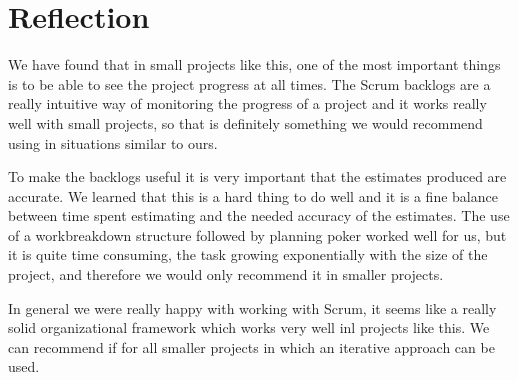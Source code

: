 \section{Reflection}

We have found that in small projects like this, one of the most important things
is to be able to see the project progress at all times. The Scrum backlogs are a
really intuitive way of monitoring the progress of a project and it works really
well with small projects, so that is definitely something we would recommend using
in situations similar to ours.

To make the backlogs useful it is very important that the estimates produced are
accurate. We learned that this is a hard thing to do well and it is a fine balance
between time spent estimating and the needed accuracy of the estimates. The use of
a workbreakdown structure followed by planning poker worked well for us, but it is
quite time consuming, the task growing exponentially with the size of the project,
and therefore we would only recommend it in smaller projects.

In general we were really happy with working with Scrum, it seems like a really solid organizational framework which works very well inl projects like this. We can recommend if for all smaller projects in which an iterative approach can be used. 
